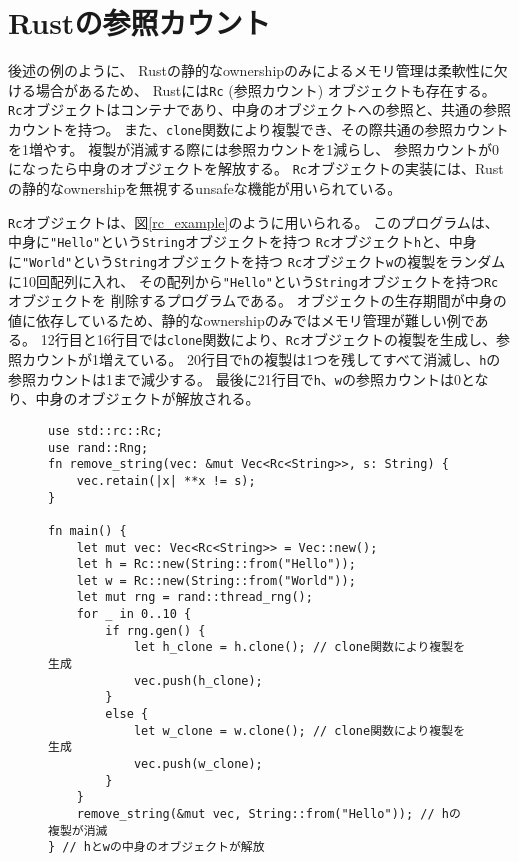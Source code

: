 \documentclass{sumiilab-paper}
\theoremstyle{mystyle}
\numberwithin{definition}{chapter} %
\begin{document}
\section{Rustの参照カウント}
後述の例のように、
Rustの静的なownershipのみによるメモリ管理は柔軟性に欠ける場合があるため、
Rustには\texttt{Rc} (参照カウント) オブジェクトも存在する。
\texttt{Rc}オブジェクトはコンテナであり、中身のオブジェクトへの参照と、共通の参照カウントを持つ。
また、\texttt{clone}関数により複製でき、その際共通の参照カウントを1増やす。
複製が消滅する際には参照カウントを1減らし、
参照カウントが0になったら中身のオブジェクトを解放する。
\texttt{Rc}オブジェクトの実装には、Rustの静的なownershipを無視するunsafeな機能が用いられている。

\texttt{Rc}オブジェクトは、図\ref{rc_example}のように用いられる。
このプログラムは、
中身に\texttt{"Hello"}という\texttt{String}オブジェクトを持つ
\texttt{Rc}オブジェクト\texttt{h}と、中身に\texttt{"World"}という\texttt{String}オブジェクトを持つ
\texttt{Rc}オブジェクト\texttt{w}の複製をランダムに10回配列に入れ、
その配列から\texttt{"Hello"}という\texttt{String}オブジェクトを持つ\texttt{Rc}オブジェクトを
削除するプログラムである。
オブジェクトの生存期間が中身の値に依存しているため、静的なownershipのみではメモリ管理が難しい例である。
12行目と16行目では\texttt{clone}関数により、\texttt{Rc}オブジェクトの複製を生成し、参照カウントが1増えている。
20行目で\texttt{h}の複製は1つを残してすべて消滅し、\texttt{h}の参照カウントは1まで減少する。
最後に21行目で\texttt{h}、\texttt{w}の参照カウントは0となり、中身のオブジェクトが解放される。
\begin{figure}[htp]
\begin{lstlisting}[caption=Rcオブジェクトの利用例, label=rc_example, captionpos=b]
use std::rc::Rc;
use rand::Rng;
fn remove_string(vec: &mut Vec<Rc<String>>, s: String) {
    vec.retain(|x| **x != s);
}

fn main() {
    let mut vec: Vec<Rc<String>> = Vec::new();
    let h = Rc::new(String::from("Hello"));
    let w = Rc::new(String::from("World"));
    let mut rng = rand::thread_rng();
    for _ in 0..10 {
        if rng.gen() {
            let h_clone = h.clone(); // clone関数により複製を生成
            vec.push(h_clone);
        }
        else {
            let w_clone = w.clone(); // clone関数により複製を生成
            vec.push(w_clone);
        }
    }
    remove_string(&mut vec, String::from("Hello")); // hの複製が消滅
} // hとwの中身のオブジェクトが解放
\end{lstlisting}
\end{figure}
\end{document}
